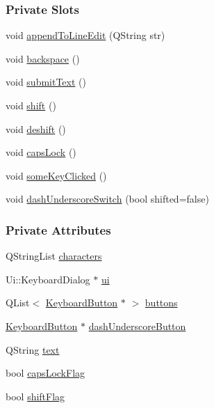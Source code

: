 \subsubsection*{Private Slots}
\begin{DoxyCompactItemize}
\item 
void \mbox{\hyperlink{classKeyboardDialog_ae6dc8c69ff16942b5185fa97423b9cc0}{append\+To\+Line\+Edit}} (Q\+String str)
\item 
void \mbox{\hyperlink{classKeyboardDialog_a471f014a3c1a8ba612fce0ef2bc135a4}{backspace}} ()
\item 
void \mbox{\hyperlink{classKeyboardDialog_ab5b4e6cdc245ddd1709a9bff9767c1c7}{submit\+Text}} ()
\item 
void \mbox{\hyperlink{classKeyboardDialog_a991a2385014b01ad257f07092cf98b11}{shift}} ()
\item 
void \mbox{\hyperlink{classKeyboardDialog_a666a29c8db901ad52b14c5b40e333608}{deshift}} ()
\item 
void \mbox{\hyperlink{classKeyboardDialog_a0baaa948c0434c2f1fe6056319fcc4e2}{caps\+Lock}} ()
\item 
void \mbox{\hyperlink{classKeyboardDialog_ab13992b7c1c3025bb96826d4da17b931}{some\+Key\+Clicked}} ()
\item 
void \mbox{\hyperlink{classKeyboardDialog_add2f730a4a7439b88b98140fbc7d09f9}{dash\+Underscore\+Switch}} (bool shifted=false)
\end{DoxyCompactItemize}
\subsubsection*{Private Attributes}
\begin{DoxyCompactItemize}
\item 
Q\+String\+List \mbox{\hyperlink{classKeyboardDialog_a6a084cc6108c5fc50c05f567d241af8b}{characters}}
\item 
Ui\+::\+Keyboard\+Dialog $\ast$ \mbox{\hyperlink{classKeyboardDialog_a6264cc8da370d38ab8a4b7a8a6539b0f}{ui}}
\item 
Q\+List$<$ \mbox{\hyperlink{classKeyboardButton}{Keyboard\+Button}} $\ast$ $>$ \mbox{\hyperlink{classKeyboardDialog_a334172863bd0cdc1fd2792b935c3dc3e}{buttons}}
\item 
\mbox{\hyperlink{classKeyboardButton}{Keyboard\+Button}} $\ast$ \mbox{\hyperlink{classKeyboardDialog_a9cbeeb36e8ca22c07310316f67a95832}{dash\+Underscore\+Button}}
\item 
Q\+String \mbox{\hyperlink{classKeyboardDialog_a840896bed408c1e8cdb44e27dee9d195}{text}}
\item 
bool \mbox{\hyperlink{classKeyboardDialog_ac42a101f1ede0b3565cbc7d87bff20b4}{caps\+Lock\+Flag}}
\item 
bool \mbox{\hyperlink{classKeyboardDialog_aad63f68247d9c00db715a2afb1bf9bc3}{shift\+Flag}}
\end{DoxyCompactItemize}


